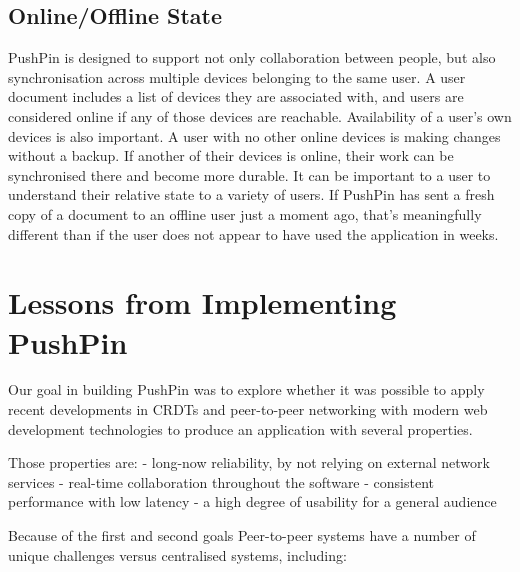 \subsection{Online/Offline State}

PushPin is designed to support not only collaboration between people, but also synchronisation across multiple devices belonging to the same user. A user document includes a list of devices they are associated with, and users are considered online if any of those devices are reachable. Availability of a user's own devices is also important. A user with no other online devices is making changes without a backup. If another of their devices is online, their work can be synchronised there and become more durable. It can be important to a user to understand their relative state to a variety of users. If PushPin has sent a fresh copy of a document to an offline user just a moment ago, that's meaningfully different than if the user does not appear to have used the application in weeks. 




\section{Lessons from Implementing PushPin}\label{sec:lessons}

Our goal in building PushPin was to explore whether it was possible to apply recent developments in CRDTs and peer-to-peer networking with modern web development technologies to produce an application with several properties.

Those properties are:
 - long-now reliability, by not relying on external network services
 - real-time collaboration throughout the software
 - consistent performance with low latency
 - a high degree of usability for a general audience 

Because of the first and second goals Peer-to-peer systems have a number of unique challenges versus centralised systems, including:

